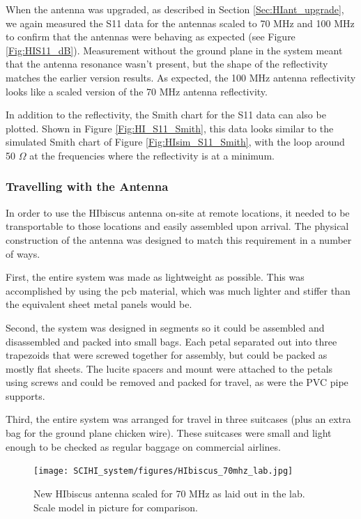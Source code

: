 When the antenna was upgraded, as described in Section \ref{Sec:HIant_upgrade}, we again measured the S11 data for the antennas scaled to 70 MHz and 100 MHz to confirm that the antennas were behaving as expected (see Figure \ref{Fig:HIS11_dB}). Measurement without the ground plane in the system meant that the antenna resonance wasn't present, but the shape of the reflectivity matches the earlier version results. As expected, the 100 MHz antenna reflectivity looks like a scaled version of the 70 MHz antenna reflectivity. 

In addition to the reflectivity, the Smith chart for the S11 data can also be plotted. Shown in Figure \ref{Fig:HI_S11_Smith}, this data looks similar to the simulated Smith chart of Figure \ref{Fig:HIsim_S11_Smith}, with the loop around 50 $\Omega$ at the frequencies where the reflectivity is at a minimum. 

\subsubsection{Travelling with the Antenna}
In order to use the HIbiscus antenna on-site at remote locations, it needed to be transportable to those locations and easily assembled upon arrival. The physical construction of the antenna was designed to match this requirement in a number of ways. 

First, the entire system was made as lightweight as possible. This was accomplished by using the pcb material, which was much lighter and stiffer than the equivalent sheet metal panels would be. 

Second, the system was designed in segments so it could be assembled and disassembled and packed into small bags. Each petal separated out into three trapezoids that were screwed together for assembly, but could be packed as mostly flat sheets. The lucite spacers and mount were attached to the petals using screws and could be removed and packed for travel, as were the PVC pipe supports. 

Third, the entire system was arranged for travel in three suitcases (plus an extra bag for the ground plane chicken wire). These suitcases were small and light enough to be checked as regular baggage on commercial airlines. 

\begin{figure}[htb]
\begin{center}
\texttt{[image: SCIHI\_system/figures/HIbiscus\_70mhz\_lab.jpg]}
\caption{New HIbiscus antenna scaled for 70 MHz as laid out in the lab. Scale model in picture for comparison.}
\label{Fig:hibiscus_70}
\end{center}
\end{figure}

